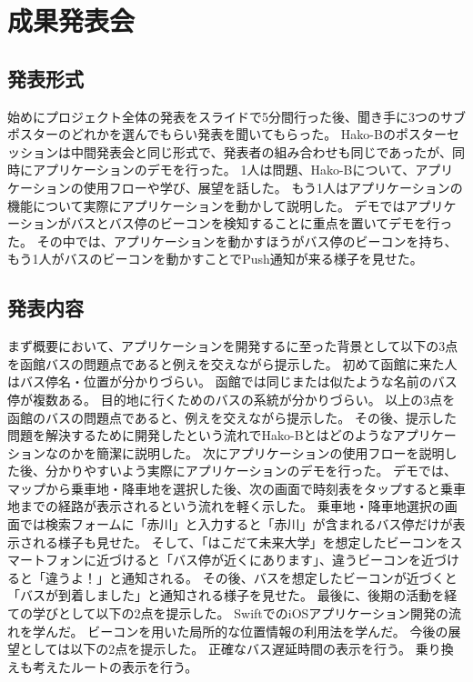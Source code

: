 \documentclass[openany,11pt,papersize]{jsbook}
\begin{document}

\section{成果発表会}
\subsection{発表形式}
始めにプロジェクト全体の発表をスライドで5分間行った後、聞き手に3つのサブポスターのどれかを選んでもらい発表を聞いてもらった。
Hako-Bのポスターセッションは中間発表会と同じ形式で、発表者の組み合わせも同じであったが、同時にアプリケーションのデモを行った。
1人は問題、Hako-Bについて、アプリケーションの使用フローや学び、展望を話した。
もう1人はアプリケーションの機能について実際にアプリケーションを動かして説明した。
デモではアプリケーションがバスとバス停のビーコンを検知することに重点を置いてデモを行った。
その中では、アプリケーションを動かすほうがバス停のビーコンを持ち、もう1人がバスのビーコンを動かすことでPush通知が来る様子を見せた。


\subsection{発表内容}
まず概要において、アプリケーションを開発するに至った背景として以下の3点を函館バスの問題点であると例えを交えながら提示した。
初めて函館に来た人はバス停名・位置が分かりづらい。
函館では同じまたは似たような名前のバス停が複数ある。
目的地に行くためのバスの系統が分かりづらい。
以上の3点を函館のバスの問題点であると、例えを交えながら提示した。
その後、提示した問題を解決するために開発したという流れでHako-Bとはどのようなアプリケーションなのかを簡潔に説明した。
次にアプリケーションの使用フローを説明した後、分かりやすいよう実際にアプリケーションのデモを行った。
デモでは、マップから乗車地・降車地を選択した後、次の画面で時刻表をタップすると乗車地までの経路が表示されるという流れを軽く示した。
乗車地・降車地選択の画面では検索フォームに「赤川」と入力すると「赤川」が含まれるバス停だけが表示される様子も見せた。
そして、「はこだて未来大学」を想定したビーコンをスマートフォンに近づけると「バス停が近くにあります」、違うビーコンを近づけると「違うよ！」と通知される。
その後、バスを想定したビーコンが近づくと「バスが到着しました」と通知される様子を見せた。
最後に、後期の活動を経ての学びとして以下の2点を提示した。
SwiftでのiOSアプリケーション開発の流れを学んだ。
ビーコンを用いた局所的な位置情報の利用法を学んだ。
今後の展望としては以下の2点を提示した。
正確なバス遅延時間の表示を行う。
乗り換えも考えたルートの表示を行う。
\end{document}
